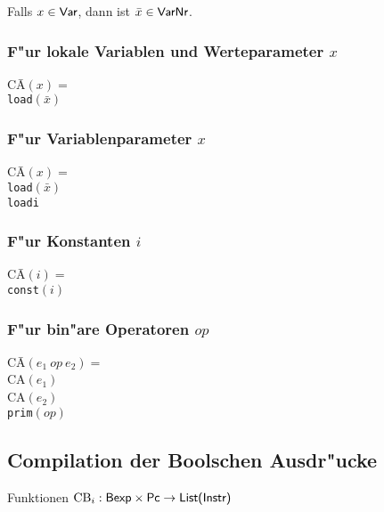 \documentclass[german,10pt, a4paper, twocolumn]{scrartcl}
\theoremstyle{definition}
\theoremstyle{remark}
\begin{document}
Falls $x\in \mbox{\sffamily Var}$, dann ist $\bar{x}\in \mbox{\sffamily VarNr}$.\\

\subsubsection{F"ur lokale Variablen und Werteparameter $x$}

\begin{tabbing}
 CA\=$(x) =$ \\
 \>	\tt{load}$(\bar{x})$
\end{tabbing}

\subsubsection{F"ur Variablenparameter $x$}

\begin{tabbing}
 CA\=$(x) =$ \\
 \>	\tt{load}$(\bar{x})$\\
 \>	\tt{loadi}
\end{tabbing}

\subsubsection{F"ur Konstanten $i$}

\begin{tabbing}
 CA\=$(i) =$ \\
 \>	\tt{const}$(i)$
\end{tabbing}

\subsubsection{F"ur bin"are Operatoren $op$}

\begin{tabbing}
 CA\=$(e_1\ op\ e_2) =$ \\
 \>	CA$(e_1)$\\
 \>	CA$(e_2)$\\
 \>	\tt{prim}$(op)$
\end{tabbing}

\subsection{Compilation der Boolschen Ausdr"ucke}

Funktionen $\mbox{CB}_i: \mbox{\sffamily{Bexp}}\times\mbox{\sffamily Pc}\rightarrow \mbox{\sffamily{List(Instr)}}$\\
\end{document}

